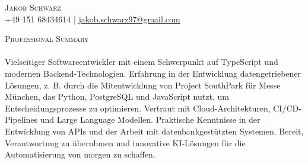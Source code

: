 \documentclass[a4paper]{article}
\newcommand{\lineunder} {
    \vspace*{-8pt} \\
    \hspace*{-18pt} \hrulefill \\
}
\newcommand{\header} [1] {
    {\hspace*{-18pt}\vspace*{6pt} \textsc{#1}}
    \vspace*{-6pt} \lineunder
}
\begin{document}
\vspace*{-40pt}
    

\vspace*{-10pt}
\begin{center}
	{\Huge \scshape {Jakob Schwarz}}\\
	+49 151 68434614 | \href{mailto:jakob.schwarz97@gmail.com}{jakob.schwarz97@gmail.com} %
\end{center}

\header{Professional Summary}

Vielseitiger Softwareentwickler mit einem Schwerpunkt auf TypeScript und modernen Backend-Technologien. Erfahrung in der Entwicklung datengetriebener Lösungen, z. B. durch die Mitentwicklung von Project SouthPark f\"ur Messe M\"unchen, das Python, PostgreSQL und JavaScript nutzt, um Entscheidungsprozesse zu optimieren. Vertraut mit Cloud-Architekturen, CI/CD-Pipelines und Large Language Modellen. Praktische Kenntnisse in der Entwicklung von APIs und der Arbeit mit datenbankgest\"utzten Systemen. Bereit, Verantwortung zu \"ubernhmen und innovative KI-L\"osungen f\"ur die Automatisierung von morgen zu schaffen.

\vspace{1mm}
\end{document}
